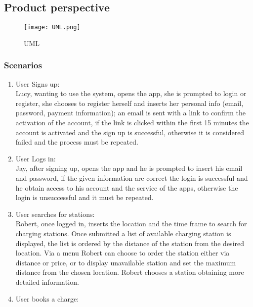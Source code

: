 \subsection{Product perspective}
\begin{figure}[h!]
      \begin{center}
            \texttt{[image: UML.png]}
            \caption{UML}
      \end{center}
\end{figure}

\subsubsection{Scenarios}
\begin{enumerate}[label=S\arabic*]
      \item User Signs up:\\
            Lucy, wanting to use the system, opens the app, she is prompted to login or register,
            she chooses to register herself and inserts her personal info (email, password, payment information);
            an email is sent with a link to confirm the activation of the account, if the link is clicked within
            the first 15 minutes the account is activated and the sign up is successful,
            otherwise it is considered failed and the process must be repeated.
      \item User Logs in:\\
            Jay, after signing up, opens the app and he is prompted to insert his email and password,
            if the given information are correct the login is successful and he obtain access to his account
            and the service of the apps, otherwise the login is unsuccessful and it must be repeated.
      \item User searches for stations:\\
            Robert, once logged in, inserts the location and the time frame to search for charging stations.
            Once submitted a list of available charging station is displayed, the list is ordered by the distance of the station
            from the desired location. Via a menu Robert can choose to order the station either via distance or price,
            or to display unavailable station and set the maximum distance from the chosen location.
            Robert chooses a station obtaining more detailed information.
      \item User books a charge:\\

\end{enumerate}
